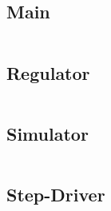 \subsection{Main}
\label{apx:Regulator}
\inputminted[breaklines]{Matlab}{./Code/Main.m}

\newpage

\subsection{Regulator}
\label{apx:Regulator}
\inputminted[breaklines]{Matlab}{./Code/Regulator.m}

\newpage

\subsection{Simulator}
\label{apx:Simulator}
\inputminted[breaklines]{Matlab}{./Code/Simulator.m}

\newpage

\subsection{Step-Driver}
\label{apx:Step-Driver}
\inputminted[breaklines]{Matlab}{./Code/StepDriver.m}